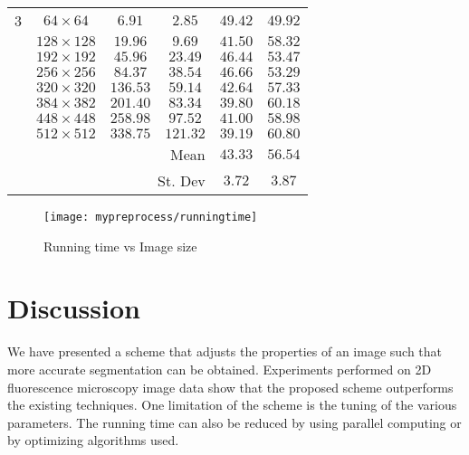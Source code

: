 \begin{definition}
\begin{table}[!h]
\begin{tabular}{|c|c|c|c|c|c|}
			3 		  	& $64\times64$ 	&$6.91$ &$2.85$ & $49.42$	&$49.92$ \\
			& $128\times128$ &$19.96$ &$9.69$ &$41.50$	&$58.32$ \\
			& $192\times192$ &$45.96$ &$23.49$ &$46.44$&$53.47$ \\
			& $256\times256$	&$84.37$ &$38.54$ &$46.66$&$53.29$ \\
			& $320\times320$ &$136.53$&$59.14$ &$42.64$&$57.33$ \\
			& $384\times382$ &$201.40$&$83.34$ &$39.80$&$60.18$ \\
			& $448\times448$ &$258.98$&$97.52$ &$41.00$&$58.98$ \\
			& $512\times512$ &$338.75$&$121.32$&$39.19$&$60.80$ \\
			\hline
			\multicolumn{4}{|r}{Mean} & $43.33$ & $56.54$ \\
			\multicolumn{4}{|r}{St. Dev} & $3.72$ & $3.87$ \\
			\hline
		\end{tabular}
	\end{table}
	
	\begin{figure}[!h]
		\centering
		\texttt{[image: mypreprocess/runningtime]}
		\caption{Running time vs Image size}
		\label{fig:results_runningtime}
	\end{figure}
\end{definition}

\section{Discussion}
\label{sec:preprocessschemediscussion}

We have  presented a scheme that adjusts the properties of an image such that more accurate segmentation can be obtained. Experiments  performed on 2D fluorescence microscopy image data show that the proposed scheme outperforms the existing techniques. One  limitation of the scheme  is the tuning of the various parameters. The running time can also be reduced by  using parallel computing or by optimizing algorithms used.
